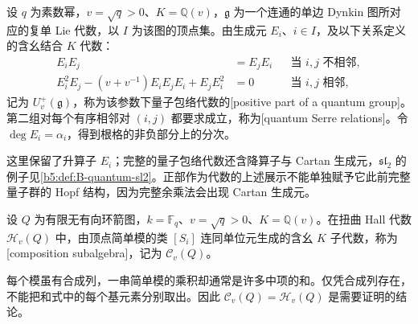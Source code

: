 \begin{definition}\label{b5:def:B-quantum-positive-part}
	设 \(q\) 为素数幂，\(v=\sqrt q>0\)、\(K=\mathbb Q(v)\)，\(\mathfrak g\) 为一个连通的单边 Dynkin 图所对应的复单 Lie 代数，以 \(I\) 为该图的顶点集。由生成元 \(E_i\)、\(i\in I\)，及以下关系定义的含幺结合 \(K\) 代数：
	\[
		\begin{aligned}
		E_iE_j&=E_jE_i&&\text{当 \(i,j\) 不相邻},\\
		E_i^2E_j-(v+v^{-1})E_iE_jE_i+E_jE_i^2&=0&&\text{当 \(i,j\) 相邻},
		\end{aligned}
	\]
	记为 \(U_v^+(\mathfrak g)\)，称为该参数下量子包络代数的[positive part of a quantum group]。第二组对每个有序相邻对 \((i,j)\) 都要求成立，称为[quantum Serre relations]。令 \(\deg E_i=\alpha_i\)，得到根格的非负部分上的分次。
\end{definition}
这里保留了升算子 \(E_i\)；完整的量子包络代数还含降算子与 Cartan 生成元，\(\mathfrak{sl}_2\) 的例子见\cref{b5:def:B-quantum-sl2}。正部作为代数的上述展示不能单独赋予它此前完整量子群的 Hopf 结构，因为完整余乘法会出现 Cartan 生成元。

\begin{definition}\label{b5:def:B-hall-composition-subalgebra}
	设 \(Q\) 为有限无有向环箭图，\(k=\mathbb F_q\)、\(v=\sqrt q>0\)、\(K=\mathbb Q(v)\)。在扭曲 Hall 代数 \(\mathcal H_v(Q)\) 中，由顶点简单模的类 \([S_i]\) 连同单位元生成的含幺 \(K\) 子代数，称为[composition subalgebra]，记为 \(\mathcal C_v(Q)\)。
\end{definition}
每个模虽有合成列，一串简单模的乘积却通常是许多中项的和。仅凭合成列存在，不能把和式中的每个基元素分别取出。因此 \(\mathcal C_v(Q)=\mathcal H_v(Q)\) 是需要证明的结论。

